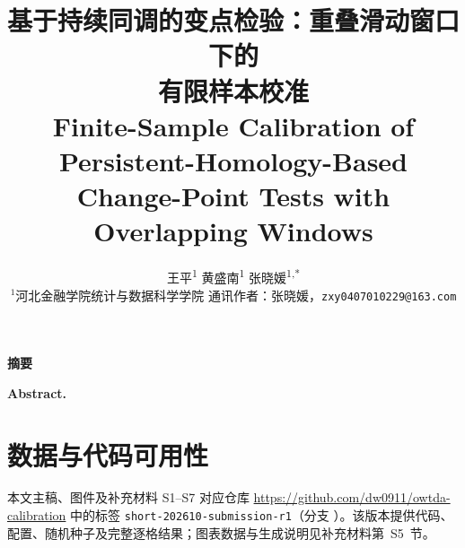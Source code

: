 \documentclass[UTF8,zihao=-4]{ctexart}
\title{基于持续同调的变点检验：重叠滑动窗口下的\\[-6pt]有限样本校准\\[4pt]
\large Finite-Sample Calibration of Persistent-Homology-Based Change-Point Tests with Overlapping Windows}
\author{
  王平\textsuperscript{1}\quad
  黄盛南\textsuperscript{1}\quad
  张晓媛\textsuperscript{1,*}\\[1mm]
  \small $^1$河北金融学院统计与数据科学学院\quad
  通讯作者：张晓媛，\texttt{zxy0407010229@163.com}
}
\date{}
\theoremstyle{remark}
\begin{document}
\maketitle
\vspace{-2.4em}

{\footnotesize
\noindent\textbf{摘要}\quad

\par}

\vspace{0.2em}
{\footnotesize
\noindent\textbf{Abstract.}\quad
\par}









\section*{数据与代码可用性}
本文主稿、图件及补充材料 S1--S7 对应仓库 \url{https://github.com/dw0911/owtda-calibration} 中的标签 \texttt{short-202610-submission-r1}（分支 ）。该版本提供代码、配置、随机种子及完整逐格结果；图表数据与生成说明见补充材料第~S5~节。



\end{document}
